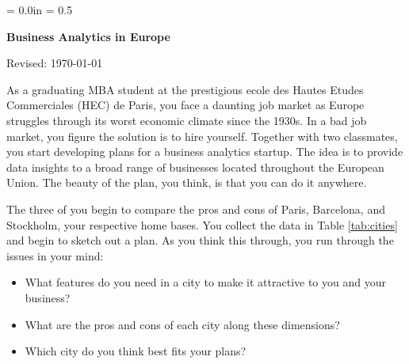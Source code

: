 \documentclass[12pt]{article}
\def\HeadName{Business Analytics in Europe}
\begin{document}
\parindent = 0.0in
\parskip = 0.5\bigskipamount
\thispagestyle{empty}%
\Head

\centerline{\large \bf \HeadName}%
\centerline{Revised:  \today}

\bigskip
As a graduating MBA student at the prestigious ecole des Hautes Etudes Commerciales (HEC) de Paris,
you face a daunting job market as Europe struggles through its 
worst economic climate since the 1930s.  
In a bad job market, you figure the solution is to hire yourself. 
Together with two classmates, you start developing plans for a business analytics startup.
The idea is to provide data insights to a broad range of businesses located
throughout the European Union.
The beauty of the plan, you think, is that you can do it anywhere.


The three of you begin to compare the pros and cons of Paris, Barcelona, and Stockholm,
your respective home bases.
You collect the data in Table \ref{tab:cities} and begin to sketch out a plan.
As you think this through, you run through the issues in your mind:
\begin{itemize} \itemsep=0.0in
\item What features do you need in a city to make it attractive to you and your business?
\item What are the pros and cons of each city along these dimensions?
\item Which city do you think best fits your plans?
\end{itemize}
\end{document}
